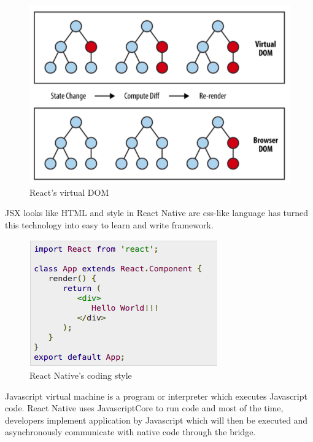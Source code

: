 \begin{figure}[!h]
   	\centering
    	\includegraphics[scale=0.4]{Picture/mobile/RN-virtualDOM.png}
       	\caption{React's virtual DOM}
	\label{fig:RN-virtualDOM}
\end{figure}
	
JSX looks like HTML and style in React Native are css-like language has turned this technology into easy to learn and write framework.\\
	
\begin{figure}[!h]
   	\centering
    	\includegraphics[scale=0.7]{Picture/mobile/RN-code.png}
        	\caption{React Native's coding style}
	\label{fig:RN-code}
\end{figure}
	


Javascript virtual machine is a program or interpreter which executes Javascript code. React Native uses JavascriptCore to run code and most of the time, developers implement application by Javascript which will then be executed and asynchronously communicate with native code through the bridge.

